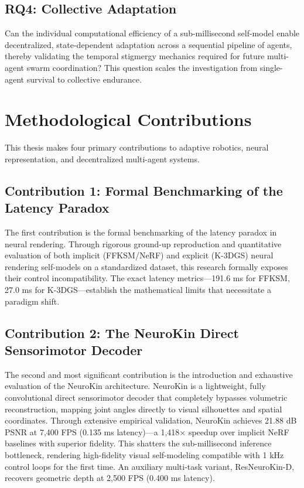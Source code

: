 \documentclass[12pt,a4paper,oneside]{report}
\begin{document}
\subsection{RQ4: Collective Adaptation}

Can the individual computational efficiency of a sub-millisecond self-model enable decentralized, state-dependent adaptation across a sequential pipeline of agents, thereby validating the temporal stigmergy mechanics required for future multi-agent swarm coordination? This question scales the investigation from single-agent survival to collective endurance.

\section{Methodological Contributions}

This thesis makes four primary contributions to adaptive robotics, neural representation, and decentralized multi-agent systems.

\subsection{Contribution 1: Formal Benchmarking of the Latency Paradox}

The first contribution is the formal benchmarking of the latency paradox in neural rendering. Through rigorous ground-up reproduction and quantitative evaluation of both implicit (FFKSM/NeRF) and explicit (K-3DGS) neural rendering self-models on a standardized dataset, this research formally exposes their control incompatibility. The exact latency metrics—191.6 ms for FFKSM, 27.0 ms for K-3DGS—establish the mathematical limits that necessitate a paradigm shift.

\subsection{Contribution 2: The NeuroKin Direct Sensorimotor Decoder}

The second and most significant contribution is the introduction and exhaustive evaluation of the NeuroKin architecture. NeuroKin is a lightweight, fully convolutional direct sensorimotor decoder that completely bypasses volumetric reconstruction, mapping joint angles directly to visual silhouettes and spatial coordinates. Through extensive empirical validation, NeuroKin achieves 21.88 dB PSNR at 7,400 FPS (0.135 ms latency)—a 1,418× speedup over implicit NeRF baselines with superior fidelity. This shatters the sub-millisecond inference bottleneck, rendering high-fidelity visual self-modeling compatible with 1 kHz control loops for the first time. An auxiliary multi-task variant, ResNeuroKin-D, recovers geometric depth at 2,500 FPS (0.400 ms latency).
\end{document}

